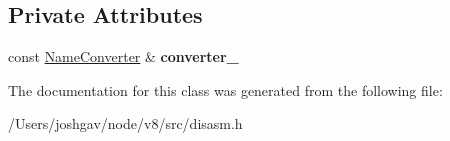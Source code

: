 \subsection*{Private Attributes}
\begin{DoxyCompactItemize}
\item 
const \hyperlink{classdisasm_1_1_name_converter}{Name\+Converter} \& {\bfseries converter\+\_\+}\hypertarget{classdisasm_1_1_disassembler_af97c48bf5b7767ee238bf0e47391f571}{}\label{classdisasm_1_1_disassembler_af97c48bf5b7767ee238bf0e47391f571}

\end{DoxyCompactItemize}


The documentation for this class was generated from the following file\+:\begin{DoxyCompactItemize}
\item 
/\+Users/joshgav/node/v8/src/disasm.\+h\end{DoxyCompactItemize}

